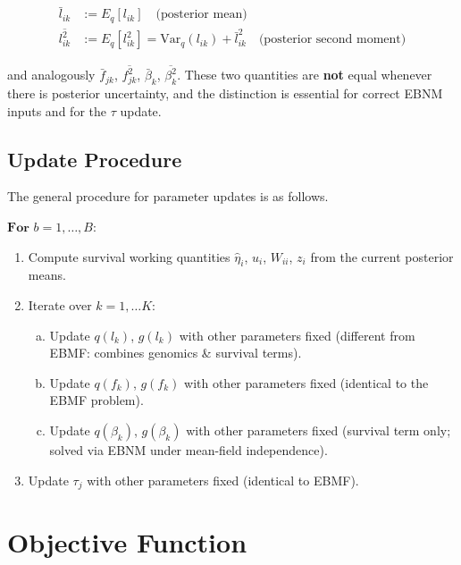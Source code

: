 \documentclass{article}[12pt]
\newcommand{\lbar}[2]{\bar{l}_{#1#2}}
\newcommand{\fbar}[2]{\bar{f}_{#1#2}}
\newcommand{\bbar}[1]{\bar{\beta}_{#1}}
\newcommand{\lsec}[2]{\overline{l^{2}_{#1#2}}}
\newcommand{\fsec}[2]{\overline{f^{2}_{#1#2}}}
\newcommand{\bsec}[1]{\overline{\beta^{2}_{#1}}}
\begin{document}
\begin{align}
    \lbar{i}{k} &:= E_{q}[l_{ik}] \quad \text{(posterior mean)} \\
    \lsec{i}{k} &:= E_{q}[l_{ik}^{2}] = \mathrm{Var}_{q}(l_{ik}) + \lbar{i}{k}^{2}
                   \quad \text{(posterior second moment)}
\end{align}

and analogously $\fbar{j}{k}$, $\fsec{j}{k}$, $\bbar{k}$, $\bsec{k}$.
These two quantities are \textbf{not} equal whenever there is posterior
uncertainty, and the distinction is essential for correct EBNM inputs and
for the $\tau$ update.

\subsection{Update Procedure}

The general procedure for parameter updates is as follows.

$\textbf{For } b=1,\ldots,B$:

\begin{enumerate}
    \item Compute survival working quantities $\hat{\eta}_i$, $u_i$, $W_{ii}$,
          $z_i$ from the current posterior means.
    \item Iterate over $k=1, \ldots K$:
    \begin{enumerate}[(a)]
        \item Update $q(l_k)$, $g(l_k)$ with other parameters fixed
              (different from EBMF: combines genomics \& survival terms).
        \item Update $q(f_k)$, $g(f_k)$ with other parameters fixed
              (identical to the EBMF problem).
        \item Update $q(\beta_k)$, $g(\beta_k)$ with other parameters fixed
              (survival term only; solved via EBNM under mean-field independence).
    \end{enumerate}
    \item Update $\tau_j$ with other parameters fixed (identical to EBMF).
\end{enumerate}

\section{Objective Function}
\end{document}

